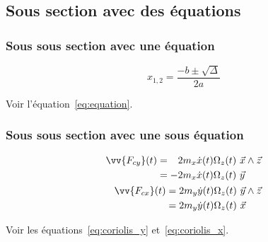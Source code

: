 \subsection{Sous section avec des équations}%
\label{sec:subsectionlabel}

\subsubsection{Sous sous section avec une équation}

\begin{equation}
    x_{1,2} = \frac{- b \pm \sqrt{\Delta}}{2a}
    \label{eq:equation}
\end{equation}

Voir l'équation~\eqref{eq:equation}.

\subsubsection{Sous sous section avec une sous équation}

\begin{subequations}
    \begin{align}
        \begin{split}
            \label{eq:coriolis_y}
            \vv{F_{cy}}(t) & = \hphantom{-}2 m_x \dot{x}(t) \Omega_z(t) \ \vec{x} \wedge \vec{z} \\
                           & = -2 m_x \dot{x}(t) \Omega_z(t) \ \vec{y}
        \end{split}\\
        \begin{split}
            \label{eq:coriolis_x}
            \vv{F_{cx}}(t) & = 2 m_y \dot{y}(t) \Omega_z(t) \ \vec{y} \wedge \vec{z}\\
                           & = 2 m_y \dot{y}(t) \Omega_z(t) \ \vec{x}
        \end{split}
    \end{align}
\end{subequations}

Voir les équations~\eqref{eq:coriolis_y} et~\eqref{eq:coriolis_x}.

